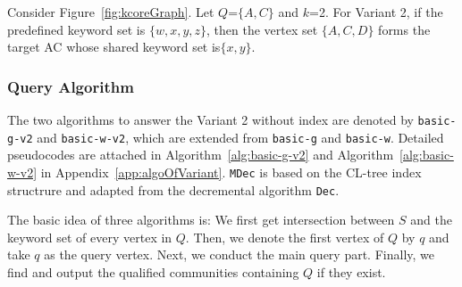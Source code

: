 \begin{example}
\label{eg:variant2}
Consider Figure~\ref{fig:kcoreGraph}. Let $Q$=$\{A,C\}$ and $k$=2.
For Variant 2, if the predefined keyword set is $\{w,x,y,z\}$,
then the vertex set $\{A,C,D\}$ forms the target AC whose shared keyword set is$\{x,y\}$.
\end{example}



\subsubsection{Query Algorithm}
The two algorithms to answer the Variant 2 without index are denoted
by {\tt basic-g-v2} and {\tt basic-w-v2}, which are extended from {\tt basic-g} and {\tt basic-w}. 
Detailed pseudocodes are attached in Algorithm~\ref{alg:basic-g-v2} and Algorithm~\ref{alg:basic-w-v2} in Appendix~\ref{app:algoOfVariant}. {\tt MDec} is based on the CL-tree index structrure and adapted from the decremental algorithm {\tt Dec}.

The basic idea of three algorithms is: We first get intersection between $S$ and the keyword set of
every vertex in $Q$. Then, we denote the first vertex of $Q$ by $q$ and take $q$ as the query vertex. 
Next, we conduct the main query part. Finally, we find and output the qualified communities containing $Q$ if they exist. 
